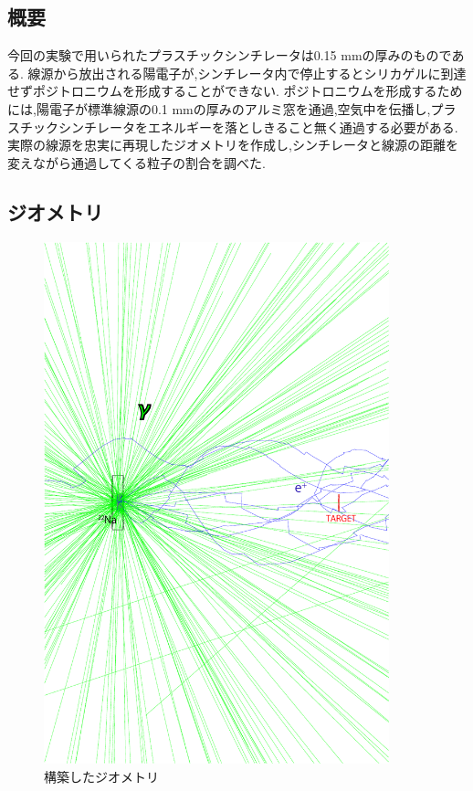 \subsection{概要}
今回の実験で用いられたプラスチックシンチレータは0.15 mmの厚みのものである.
線源から放出される陽電子が,シンチレータ内で停止するとシリカゲルに到達せずポジトロニウムを形成することができない.
ポジトロニウムを形成するためには,陽電子が標準線源の0.1 mmの厚みのアルミ窓を通過,空気中を伝播し,プラスチックシンチレータをエネルギーを落としきること無く通過する必要がある.
実際の線源を忠実に再現したジオメトリを作成し,シンチレータと線源の距離を変えながら通過してくる粒子の割合を調べた.



\subsection{ジオメトリ}

\begin{figure}[htbp]
	\centering
		\includegraphics[width=10cm]{img/test1_geometry.pdf}
	\caption{構築したジオメトリ}
	\label{test1_geometry}
\end{figure}

